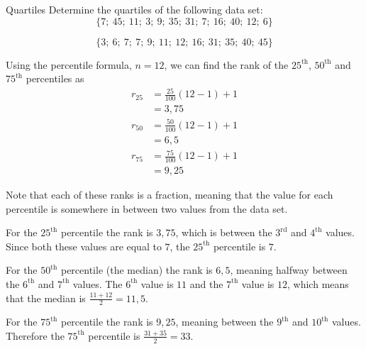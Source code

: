 
\begin{wex}{Quartiles}
{Determine the quartiles of the following data set:
    \begin{equation*}
      \{7;\ 45;\ 11;\ 3;\ 9;\ 35;\ 31;\ 7;\ 16;\ 40;\ 12;\ 6\}
    \end{equation*}
}{
    \begin{equation*}
      \{3;\ 6;\ 7;\ 7;\ 9;\ 11;\ 12;\ 16;\ 31;\ 35;\ 40;\ 45\}
    \end{equation*}


    Using the percentile formula, $n=12$, we can find the rank of the $25^{\mathrm{th}}$,
    $50^{\mathrm{th}}$ and $75^{\mathrm{th}}$ percentiles as
    \begin{align*}
      r_{25} &= \frac{25}{100}\left(12-1\right)+1 \\
            &= 3,75 \\
      r_{50} &= \frac{50}{100}\left(12-1\right)+1 \\
            &= 6,5 \\
      r_{75} &= \frac{75}{100}\left(12-1\right)+1 \\
            &= 9,25
    \end{align*}


    Note that each of these ranks is a fraction, meaning that the
    value for each percentile is somewhere in between two values from
    the data set.

    For the $25^{\mathrm{th}}$ percentile the rank is $3,75$, which is between
    the $3^{\mathrm{rd}}$ and $4^{\mathrm{th}}$ values. Since both these values are equal to
    $7$, the $25^{\mathrm{th}}$ percentile is $7$.

    For the $50^{\mathrm{th}}$ percentile (the median) the rank is $6,5$, meaning
    halfway between the $6^{\mathrm{th}}$ and $7^{\mathrm{th}}$ values. The $6^{\mathrm{th}}$ value is
    $11$ and the $7^{\mathrm{th}}$ value is $12$, which means that the median is
    \(\frac{11+12}{2} = 11,5\).

    For the $75^{\mathrm{th}}$ percentile the rank is $9,25$, meaning between the
    $9^{\mathrm{th}}$ and $10^{\mathrm{th}}$ values. Therefore the $75^{\mathrm{th}}$ percentile is
    \(\frac{31+35}{2} = 33\).
  }
\end{wex}


